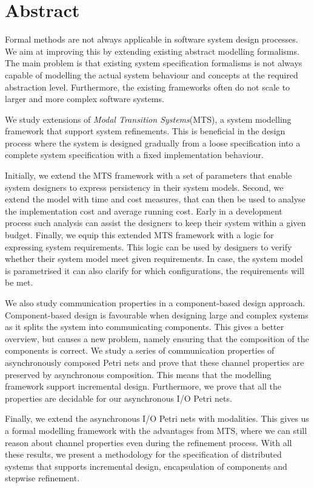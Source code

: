 \chapter*{Abstract}

Formal methods are not always applicable in software system design processes. We aim at improving this by extending existing abstract modelling formalisms. The main problem is that existing system specification formalisms is not always capable of modelling the actual system behaviour and concepts at the required abstraction level. Furthermore, the existing frameworks often do not scale to larger and more complex software systems.

We study extensions of \emph{Modal Transition Systems}(MTS), a system modelling framework that support system refinements. This is beneficial in the design process where the system is designed gradually from a loose specification into a complete system specification with a fixed implementation behaviour. 

Initially, we extend the MTS framework with a set of parameters that enable system designers to express persistency in their system models. Second, we extend the model with time and cost measures, that can then be used to analyse the implementation cost and average running cost. Early in a development process such analysis can assist the designers to keep their system within a given budget. Finally, we equip this extended MTS framework with a logic for expressing system requirements. This logic can be used by designers to verify whether their system model meet given requirements. In case, the system model  is parametrised it can also clarify for which configurations, the requirements will be met.

We also study communication properties in a component-based design approach. Component-based design is favourable when designing large and complex systems as it splits the system into communicating components. This gives a better overview, but causes a new problem, namely ensuring that the composition of the components is correct. We study a series of communication properties of asynchronously composed Petri nets and prove that these channel properties are preserved by asynchronous composition. This means that the modelling framework support incremental design. Furthermore, we prove that all the properties are decidable for our asynchronous I/O Petri nets.

Finally, we extend the asynchronous I/O Petri nets with modalities. This gives us a formal modelling framework with the advantages from MTS, where we can still reason about channel properties even during the refinement process. With all these results, we present a methodology for the specification of distributed systems that supports incremental design, encapsulation of components and stepwise refinement.